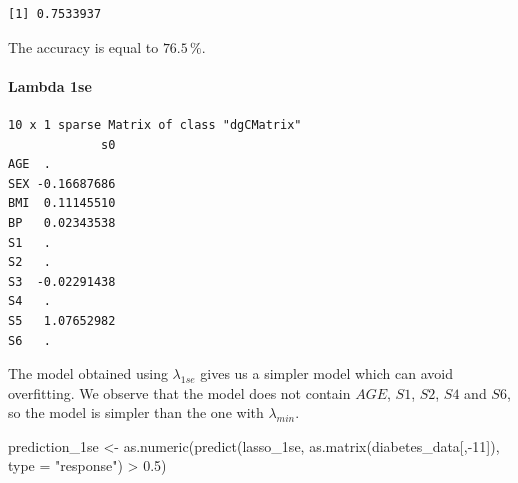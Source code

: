 \documentclass[
]{article}
\newenvironment{Shaded}{\begin{snugshade}}{\end{snugshade}}
\newcommand{\AttributeTok}[1]{\textcolor[rgb]{0.77,0.63,0.00}{#1}}
\newcommand{\DecValTok}[1]{\textcolor[rgb]{0.00,0.00,0.81}{#1}}
\newcommand{\FloatTok}[1]{\textcolor[rgb]{0.00,0.00,0.81}{#1}}
\newcommand{\FunctionTok}[1]{\textcolor[rgb]{0.00,0.00,0.00}{#1}}
\newcommand{\NormalTok}[1]{#1}
\newcommand{\OtherTok}[1]{\textcolor[rgb]{0.56,0.35,0.01}{#1}}
\newcommand{\SpecialCharTok}[1]{\textcolor[rgb]{0.00,0.00,0.00}{#1}}
\newcommand{\StringTok}[1]{\textcolor[rgb]{0.31,0.60,0.02}{#1}}
\begin{document}
\begin{verbatim}
[1] 0.7533937
\end{verbatim}

The accuracy is equal to \(76.5\,\%\).

\hypertarget{lambda-1se-1}{%
\paragraph{Lambda 1se}\label{lambda-1se-1}}

\begin{Shaded}
\end{Shaded}

\begin{verbatim}
10 x 1 sparse Matrix of class "dgCMatrix"
             s0
AGE  .         
SEX -0.16687686
BMI  0.11145510
BP   0.02343538
S1   .         
S2   .         
S3  -0.02291438
S4   .         
S5   1.07652982
S6   .         
\end{verbatim}

The model obtained using \(\lambda_{1se}\) gives us a simpler model
which can avoid overfitting. We observe that the model does not contain
\(AGE\), \(S1\), \(S2\), \(S4\) and \(S6\), so the model is simpler than
the one with \(\lambda_{min}\).

\begin{Shaded}
\begin{Highlighting}[]
\NormalTok{prediction\_1se }\OtherTok{\textless{}{-}} \FunctionTok{as.numeric}\NormalTok{(}\FunctionTok{predict}\NormalTok{(lasso\_1se, }\FunctionTok{as.matrix}\NormalTok{(diabetes\_data[,}\SpecialCharTok{{-}}\DecValTok{11}\NormalTok{]), }\AttributeTok{type =} \StringTok{"response"}\NormalTok{) }\SpecialCharTok{\textgreater{}} \FloatTok{0.5}\NormalTok{)}
\end{Highlighting}
\end{Shaded}
\end{document}
